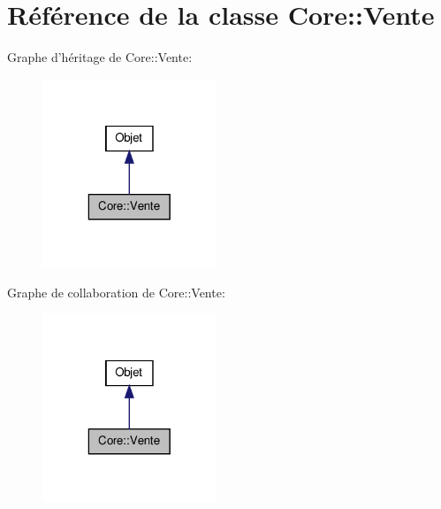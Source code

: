 \hypertarget{class_core_1_1_vente}{
\section{Référence de la classe Core::Vente}
\label{d9/d66/class_core_1_1_vente}
}


Graphe d'héritage de Core::Vente:\nopagebreak
\begin{figure}[H]
\begin{center}
\leavevmode
\includegraphics[width=148pt]{d5/da7/class_core_1_1_vente__inherit__graph}
\end{center}
\end{figure}


Graphe de collaboration de Core::Vente:\nopagebreak
\begin{figure}[H]
\begin{center}
\leavevmode
\includegraphics[width=148pt]{d6/d08/class_core_1_1_vente__coll__graph}
\end{center}
\end{figure}
